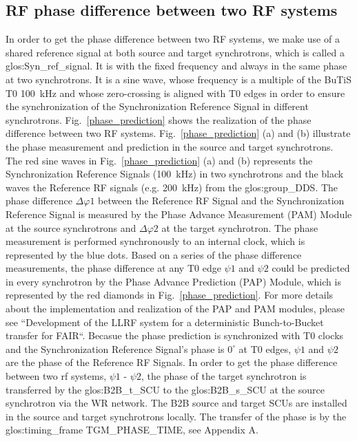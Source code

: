 \subsection{RF phase difference between two RF systems}
In order to get the phase difference between two RF systems, we make use of a shared reference signal at both source and target synchrotrons, which is called a \gls{glos:Syn_ref_signal}. It is with the fixed frequency and always in the same phase at two synchrotrons. It is a sine wave, whose frequency is a multiple of the BuTiS T0 \SI{100}{kHz} and whose zero-crossing is aligned with T0 edges in order to ensure the synchronization of the Synchronization Reference Signal in different synchrotrons. Fig.~\ref{phase_prediction} shows the realization of the phase difference between two RF systems. Fig.~\ref{phase_prediction} (a) and (b) illustrate the phase measurement and prediction in the source and target synchrotrons. The red sine waves in Fig.~\ref{phase_prediction} (a) and (b) represents the Synchronization Reference Signals (\SI{100}{kHz}) in two synchrotrons and the black waves the Reference RF signals (e.g. \SI{200}{kHz}) from the \gls{glos:group_DDS}. The phase difference $\Delta \varphi1$ between the Reference RF Signal and the Synchronization Reference Signal is measured by the Phase Advance Measurement (\gls{PAM}) Module at the source synchrotrons and $\Delta \varphi2$ at the target synchrotron. The phase measurement is performed synchronously to an internal clock, which is represented by the blue dots. Based on a series of the phase difference measurements, the phase difference at any T0 edge $\psi1$ and $\psi2$ could be predicted in every synchrotron by the Phase Advance Prediction (\gls{PAP}) Module, which is represented by the red diamonds in Fig.~\ref{phase_prediction}. For more details about the implementation and realization of the PAP and PAM modules, please see ``Development of the LLRF system for a deterministic Bunch-to-Bucket transfer for FAIR``. Becasue the phase prediction is synchronized with T0 clocks and the Synchronization Reference Signal's phase is $0^\circ$ at T0 edges, $\psi1$ and $\psi2$ are the phase of the Reference RF Signals. In order to get the phase difference between two rf systems, $\psi1$ - $\psi2$, the phase of the target synchrotron is transferred by the \gls{glos:B2B_t_SCU} to the \gls{glos:B2B_s_SCU} at the source synchrotron via the WR network. The B2B source and target SCUs are installed in the source and target synchrotrons locally. The transfer of the phase is by the \gls{glos:timing_frame} TGM\_PHASE\_TIME, see Appendix A.

